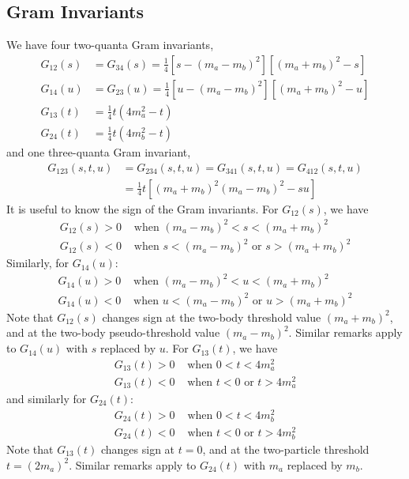 \subsection{Gram Invariants}
We have four two-quanta Gram invariants,
\begin{align}
	G_{12}(s) &= G_{34}(s) = \frac{1}{4} [s - (m_{a} - m_{b})^{2}] [(m_{a} + m_{b})^{2} - s] \\
	G_{14}(u) &= G_{23}(u) = \frac{1}{4} [u - (m_{a} - m_{b})^{2}] [(m_{a} + m_{b})^{2} - u] \\
	G_{13}(t) &= \frac{1}{4} t (4m_{a}^{2} - t) \\
	G_{24}(t) &= \frac{1}{4} t (4m_{b}^{2} - t)
\end{align}
and one three-quanta Gram invariant,
\begin{align}
	G_{123}(s, t, u) &= G_{234}(s, t, u) = G_{341}(s, t, u) = G_{412}(s, t, u) \nonumber \\
	&= \frac{1}{4} t \left[ (m_{a} + m_{b})^{2} (m_{a} - m_{b})^{2} - s u \right]
\end{align}
It is useful to know the sign of the Gram invariants. For $G_{12}(s)$, we have
\begin{align}
	G_{12}(s) > 0 &\text{ when } (m_{a} - m_{b})^{2} < s < (m_{a} + m_{b})^{2} \\
	G_{12}(s) < 0 &\text{ when } s < (m_{a} - m_{b})^{2} \text{ or } s > (m_{a} + m_{b})^{2}
\end{align}
Similarly, for $G_{14}(u)$:
\begin{align}
	G_{14}(u) > 0 &\text{ when } (m_{a} - m_{b})^{2} < u < (m_{a} + m_{b})^{2} \\
	G_{14}(u) < 0 &\text{ when } u < (m_{a} - m_{b})^{2} \text{ or } u > (m_{a} + m_{b})^{2}
\end{align}
Note that $G_{12}(s)$ changes sign at the two-body threshold value $(m_{a} + m_{b})^{2}$, and at the two-body pseudo-threshold value $(m_{a} - m_{b})^{2}$. Similar remarks apply to $G_{14}(u)$ with $s$ replaced by $u$. For $G_{13}(t)$, we have
\begin{align}
	G_{13}(t) > 0 &\text{ when } 0 < t < 4m_{a}^{2} \\
	G_{13}(t) < 0 &\text{ when } t < 0 \text{ or } t > 4m_{a}^{2}
\end{align}
and similarly for $G_{24}(t)$:
\begin{align}
	G_{24}(t) > 0 &\text{ when } 0 < t < 4m_{b}^{2} \\
	G_{24}(t) < 0 &\text{ when } t < 0 \text{ or } t > 4m_{b}^{2}
\end{align}
Note that $G_{13}(t)$ changes sign at $t = 0$, and at the two-particle threshold $t = (2m_{a})^{2}$. Similar remarks apply to $G_{24}(t)$ with $m_{a}$ replaced by $m_{b}$.

